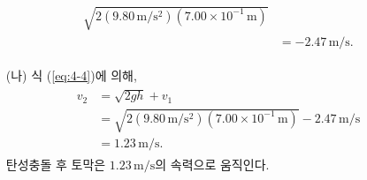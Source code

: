\documentclass[floatfix,nofootinbib,superscriptaddress,fleqn]{revtex4-2}
\begin{document}
\begin{itemize}
\begin{align}
\begin{split}
    \sqrt{2(9.80\,\mathrm{m/s^2})(7.00\times 10^{-1}\,\mathrm{m})}  \\
    &= -2.47\,\mathrm{m/s}.
  \end{split}
\end{align}
\item[(나)] 식 (\ref{eq:4-4})에 의해,
\begin{align}
  \begin{split}
    v_2 &= \sqrt{2gh}+v_1  \\
    &=\sqrt{2(9.80\,\mathrm{m/s^2})(7.00\times 10^{-1}\,\mathrm{m})}
    -2.47\,\mathrm{m/s} \\
    &=1.23\,\mathrm{m/s}.
  \end{split}
\end{align}
탄성충돌 후 토막은 $1.23\,\mathrm{m/s}$의 속력으로 움직인다.
\end{itemize}
\end{document}
